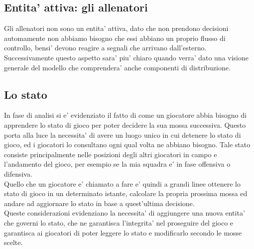 \subsection*{Entita’ attiva: gli allenatori}
%
\label{sec:entita_allenatori}

Gli allenatori non sono un entita’ attiva, dato che non prendono decisioni automamente non abbiamo bisogno che essi abbiano un proprio flusso di controllo, bensi’ devono reagire a segnali che arrivano dall’esterno. Successivamente questo aspetto sara’ piu’ chiaro quando verra’ dato una visione generale del modello che comprendera’ anche componenti di distribuzione.

\subsection*{Lo stato}
%
\label{sec:entita_stato}

In fase di analisi si e' evidenziato il fatto di come un giocatore abbia bisogno di apprendere lo stato di gioco per poter decidere la sua mossa successiva. Questo porta alla luce la necessita’ di avere un luogo unico in cui detenere lo stato di gioco, ed i giocatori lo consultano ogni qual volta ne abbiano bisogno. Tale stato consiste principalmente nelle posizioni degli altri giocatori in campo e l’andamento del gioco, per esempio se la mia squadra e’ in fase offensiva o difensiva.\\
Quello che un giocatore e’ chiamato a fare e’ quindi a grandi linee ottenere lo stato di gioco in un determinato istante, calcolare la propria prossima mossa ed andare ad aggiornare lo stato in base a quest’ultima decisione.\\

Queste considerazioni evidenziano la necessita’ di aggiungere una nuova entita’ che governi lo stato, che ne garantisca l'integrita' nel proseguire del gioco e garantisca ai giocatori di poter leggere lo stato e modificarlo secondo le mosse scelte.